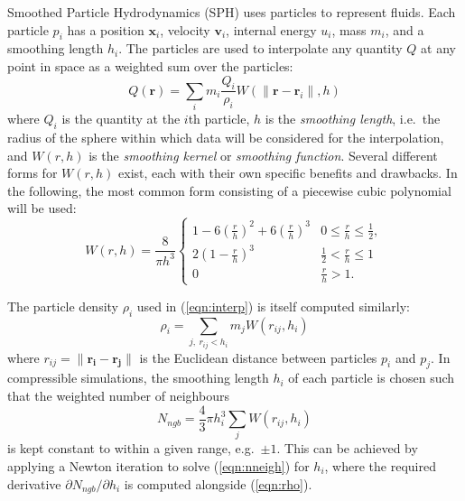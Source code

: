 \documentclass[final]{siamltex}
\newcommand{\eqn}[1]
    {(\ref{eqn:#1})}
\begin{document}
Smoothed Particle Hydrodynamics \cite{ref:Gingold1977,ref:Price2012}
 (SPH) uses particles to represent
fluids.
Each particle $p_i$ has a position $\mathbf x_i$,
velocity $\mathbf v_i$, internal energy $u_i$, mass $m_i$,
and a smoothing length $h_i$.
The particles are used to interpolate any quantity $Q$ at any 
point in space as a weighted sum over the particles:
%
\begin{equation}
    Q(\mathbf r) = \sum_i m_i \frac{Q_i}{\rho_i} W( \|\mathbf r - \mathbf r_i\| , h )
    \label{eqn:interp}
\end{equation}
%
where $Q_i$ is the quantity at the $i$th particle, $h$ is the
{\em smoothing length}, i.e.~the radius of the sphere within which data will
be considered for the interpolation, and
$W(r,h)$ is the {\em smoothing kernel} or {\em smoothing function}.
Several different forms for $W(r,h)$ exist, each with their own specific
benefits and drawbacks.
In the following, the most common form consisting of a piecewise
cubic polynomial will be used:
%
\begin{equation*}
    W(r,h) = \frac{8}{\pi h^3} \left\{
        \begin{array}{ll}
            1 - 6\left(\frac{r}{h}\right)^2 + 6\left(\frac{r}{h}\right)^3 & 0 \leq \frac{r}{h} \leq \frac{1}{2}, \\
            2\left( 1 - \frac{r}{h} \right)^3 & \frac{1}{2} < \frac{r}{h} \leq 1 \\
            0 & \frac{r}{h} > 1.
        \end{array}\right.
\end{equation*}

The particle density $\rho_i$ used in \eqn{interp} is itself
computed similarly:
%
\begin{equation}
    \rho_i = \sum_{j,~r_{ij} < h_i} m_j W(r_{ij},h_i)
    \label{eqn:rho}
\end{equation}
%
where $r_{ij} = \|\mathbf{r_i}-\mathbf{r_j}\|$ is the Euclidean
distance between particles $p_i$ and $p_j$.
In compressible simulations, the smoothing length $h_i$ of each
particle is chosen such that the weighted number of neighbours
%
\begin{equation}
    N_{ngb} = \frac{4}{3}\pi h_i^3 \sum_j W( r_{ij} , h_i )
    \label{eqn:nneigh}
\end{equation}
%
is kept constant to within a given range, e.g.~$\pm 1$.
This can be achieved by applying a Newton iteration to solve
\eqn{nneigh} for $h_i$, where the required derivative
$\partial N_{ngb}/\partial h_i$ is computed alongside \eqn{rho}.
\end{document}

